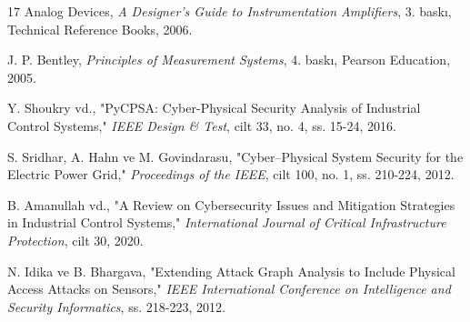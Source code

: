 \documentclass[12pt,a4paper]{article}
\begin{document}
\begin{thebibliography}{17}
Analog Devices, \emph{A Designer's Guide to Instrumentation Amplifiers}, 3. baskı, Technical Reference Books, 2006.

J. P. Bentley, \emph{Principles of Measurement Systems}, 4. baskı, Pearson Education, 2005.

Y. Shoukry vd., "PyCPSA: Cyber-Physical Security Analysis of Industrial Control Systems," \emph{IEEE Design \& Test}, cilt 33, no. 4, ss. 15-24, 2016.

S. Sridhar, A. Hahn ve M. Govindarasu, "Cyber–Physical System Security for the Electric Power Grid," \emph{Proceedings of the IEEE}, cilt 100, no. 1, ss. 210-224, 2012.

B. Amanullah vd., "A Review on Cybersecurity Issues and Mitigation Strategies in Industrial Control Systems," \emph{International Journal of Critical Infrastructure Protection}, cilt 30, 2020.

N. Idika ve B. Bhargava, "Extending Attack Graph Analysis to Include Physical Access Attacks on Sensors," \emph{IEEE International Conference on Intelligence and Security Informatics}, ss. 218-223, 2012.

\end{thebibliography}
\end{document}
